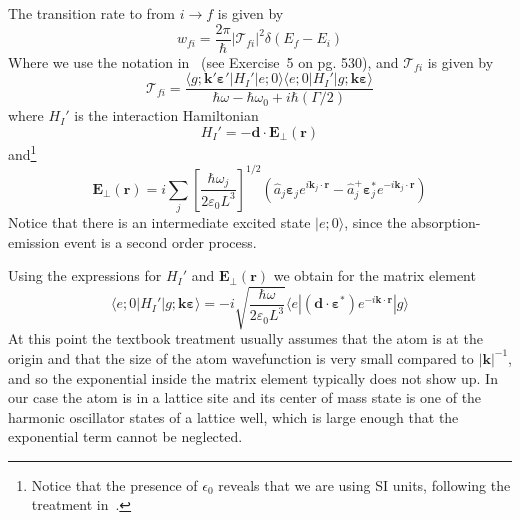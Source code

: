 \documentclass[11pt,letter]{article}
\newcommand{\bv}[1]{\ensuremath{\bm{#1}}}
\begin{document}
The transition rate to from $i\rightarrow f$ is given by 
\begin{equation}
    \label{eq:transitionRate}
    w_{fi} = \frac{2\pi}{\hbar} | \mathcal{T}_{fi} |^{2} \delta(E_{f}-E_{i})
\end{equation}
Where we use the notation in~\cite{cohen1998atom} (see Exercise~5 on pg. 530),
and $\mathcal{T}_{fi}$ is given by
\begin{equation}
    \mathcal{T}_{fi} = \frac{  
        \langle g; \bv{k}'\bv{\varepsilon}'| H_{I}' | e; 0 \rangle 
        \langle e; 0 | H_{I}' | g; \bv{k}\bv{\varepsilon} \rangle }
        { \hbar\omega - \hbar\omega_{0} + i\hbar (\Gamma/2 ) }
\end{equation} 
where $H_{I}'$ is the interaction Hamiltonian
\begin{equation}
    H_{I}' = -\bv{d} \cdot \bv{E}_{\perp} ( \bv{r} ) 
\end{equation}
and\footnote{Notice that the presence of $\epsilon_{0}$ reveals that we are
using SI units, following the treatment in~\cite{cohen1998atom}.}
\begin{equation}
    \bv{E}_{\perp}(\bv{r}) = i \sum_{j} 
        \left[ \frac{ \hbar \omega_{j} }{ 2\varepsilon_{0} L^{3}}  \right]^{1/2}
        \left( \hat{a}_{j}\bv{\varepsilon}_{j} e^{i\bv{k}_{j}\cdot\bv{r}} 
              - \hat{a}_{j}^{+}\bv{\varepsilon}_{j}^{*} e^{-i\bv{k}_{j}
                \cdot\bv{r}} 
        \right)
\end{equation}
Notice that there is an intermediate excited state $|e;0\rangle$, since the
absorption-emission event is a second order process.

Using the expressions for $H_{I}'$ and $\bv{E}_{\perp}(\bv{r})$ we obtain for
the matrix element 
\begin{equation}
   \langle e; 0 | H_{I}' | g; \bv{k}\bv{\varepsilon} \rangle = 
       -i \sqrt{ \frac{ \hbar \omega }{2 \varepsilon_{0} L^{3} }} 
      \langle e | (\bv{d} \cdot \bv{\varepsilon}^{*} ) 
       e^{-i\bv{k}\cdot\bv{r}}| g \rangle
\end{equation}
At this point the textbook treatment usually assumes that the atom is at the
origin and that the size of the atom wavefunction is very small compared to
$|\bv{k}|^{-1}$, and so the exponential inside the matrix element typically
does not show up.  In our case the atom is in a lattice site and its center of
mass state is one of the harmonic oscillator states of a lattice well, which is
large enough that the exponential term cannot be neglected.  
 
\end{document}
